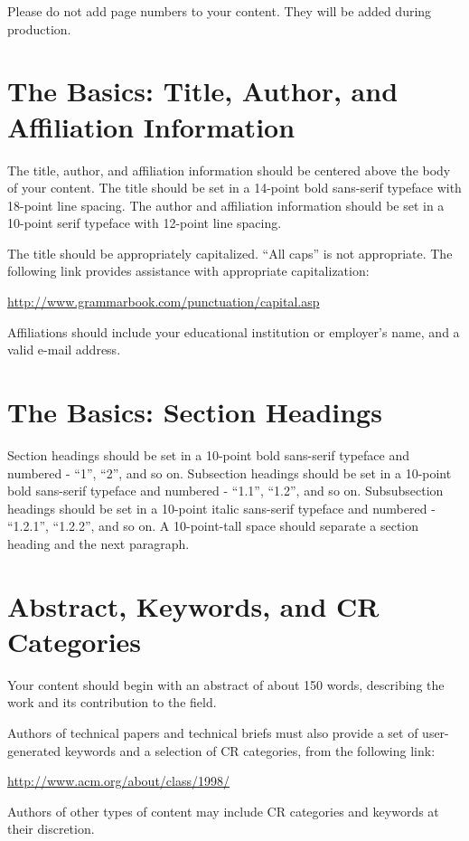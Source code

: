 \documentclass[tog]{acmsiggraph}
\begin{document}
Please do not add page numbers to your content. They will be added
during production.

\section{The Basics: Title, Author, and Affiliation Information}

The title, author, and affiliation information should be centered
above the body of your content. The title should be set in a 14-point
bold sans-serif typeface with 18-point line spacing. The author and
affiliation information should be set in a 10-point serif typeface
with 12-point line spacing.

The title should be appropriately capitalized. ``All caps'' is not
appropriate. The following link provides assistance with appropriate
capitalization:

{\small\url{http://www.grammarbook.com/punctuation/capital.asp}}

Affiliations should include your educational institution or employer's
name, and a valid e-mail address.

\section{The Basics: Section Headings}

Section headings should be set in a 10-point bold sans-serif typeface
and numbered - ``1'', ``2'', and so on. Subsection headings should be
set in a 10-point bold sans-serif typeface and numbered - ``1.1'',
``1.2'', and so on. Subsubsection headings should be set in a 10-point
italic sans-serif typeface and numbered - ``1.2.1'', ``1.2.2'', and so
on. A 10-point-tall space should separate a section heading and the
next paragraph.

\section{Abstract, Keywords, and CR Categories}

Your content should begin with an abstract of about 150 words,
describing the work and its contribution to the field.

Authors of technical papers and technical briefs must also provide a
set of user-generated keywords and a selection of CR categories, from
the following link:

{\small\url{http://www.acm.org/about/class/1998/}}

Authors of other types of content may include CR categories and
keywords at their discretion.
\end{document}
